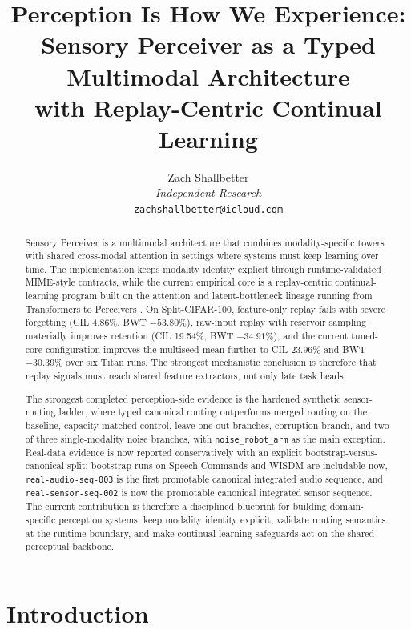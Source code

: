 \documentclass{article}
\title{Perception Is How We Experience:\\
       Sensory Perceiver as a Typed Multimodal Architecture\\
       with Replay-Centric Continual Learning}
\author{
  Zach Shallbetter\\
  \textit{Independent Research}\\
  \texttt{zachshallbetter@icloud.com}
}
\begin{document}
\maketitle

\begin{abstract}
Sensory Perceiver is a multimodal architecture that combines modality-specific towers with shared cross-modal attention in settings where systems must keep learning over time. The implementation keeps modality identity explicit through runtime-validated MIME-style contracts, while the current empirical core is a replay-centric continual-learning program built on the attention and latent-bottleneck lineage running from Transformers to Perceivers \citep{cite1,cite2,cite3}. On Split-CIFAR-100, feature-only replay fails with severe forgetting (CIL 4.86\%, BWT $-53.80\%$), raw-input replay with reservoir sampling materially improves retention (CIL 19.54\%, BWT $-34.91\%$), and the current tuned-core configuration improves the multiseed mean further to CIL 23.96\% and BWT $-30.39\%$ over six Titan runs. The strongest mechanistic conclusion is therefore that replay signals must reach shared feature extractors, not only late task heads.

The strongest completed perception-side evidence is the hardened synthetic sensor-routing ladder, where typed canonical routing outperforms merged routing on the baseline, capacity-matched control, leave-one-out branches, corruption branch, and two of three single-modality noise branches, with \texttt{noise\_robot\_arm} as the main exception. Real-data evidence is now reported conservatively with an explicit bootstrap-versus-canonical split: bootstrap runs on Speech Commands and WISDM are includable now, \texttt{real-audio-seq-003} is the first promotable canonical integrated audio sequence, and \texttt{real-sensor-seq-002} is now the promotable canonical integrated sensor sequence. The current contribution is therefore a disciplined blueprint for building domain-specific perception systems: keep modality identity explicit, validate routing semantics at the runtime boundary, and make continual-learning safeguards act on the shared perceptual backbone.
\end{abstract}

\section{Introduction}
\end{document}
